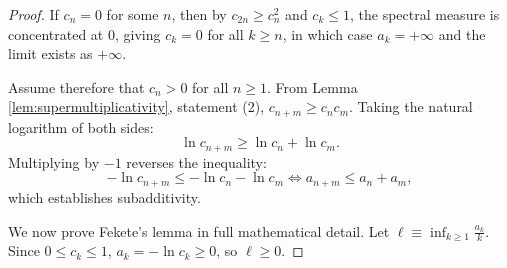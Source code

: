 \begin{proof}
If $c_n = 0$ for some $n$, then by $c_{2n} \ge c_n^2$ and $c_k \le 1$, the spectral measure is concentrated at 0, giving $c_k = 0$ for all $k \ge n$, in which case $a_k = +\infty$ and the limit exists as $+\infty$.

Assume therefore that $c_n > 0$ for all $n \ge 1$. From Lemma \ref{lem:supermultiplicativity}, statement (2), $c_{n+m} \ge c_n c_m$. Taking the natural logarithm of both sides:
\begin{equation}
\ln c_{n+m} \ge \ln c_n + \ln c_m.
\end{equation}
Multiplying by $-1$ reverses the inequality:
\begin{equation}
-\ln c_{n+m} \le -\ln c_n - \ln c_m \iff a_{n+m} \le a_n + a_m,
\end{equation}
which establishes subadditivity.

We now prove Fekete's lemma in full mathematical detail. Let $\ell \equiv \inf_{k \ge 1} \frac{a_k}{k}$. Since $0 \le c_k \le 1$, $a_k = -\ln c_k \ge 0$, so $\ell \ge 0$.


\end{proof}
